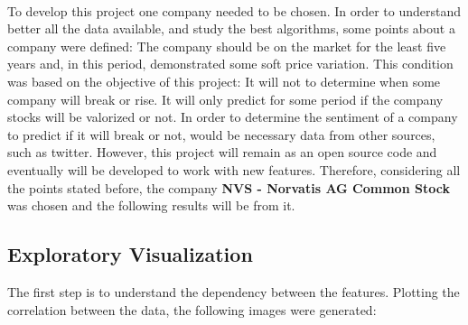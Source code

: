 \ \\
To develop this project one company needed to be chosen. In order to understand better all the data available, and study the best algorithms, some points about a company were defined: The
company should be on the market for the least five years and, in this period, demonstrated some soft price variation.
This condition was based on the objective of this project: It will not to determine when some company will break or rise. It will only predict for some period if the company stocks will
be valorized or not. In order to determine the sentiment of a company to predict if it will break or not, would be necessary data from other sources, such as twitter.
However, this project will remain as an open source code and eventually will be developed to work with new features. 
Therefore, considering all the points stated before, the company \textbf{NVS - Norvatis AG Common Stock}  was chosen and the following results will be from it.\\


\subsection{Exploratory Visualization}
\label{subsec:Exploratory_visu}
The first step is to understand the dependency between the features. Plotting the correlation between the data, the following images were generated:\\

